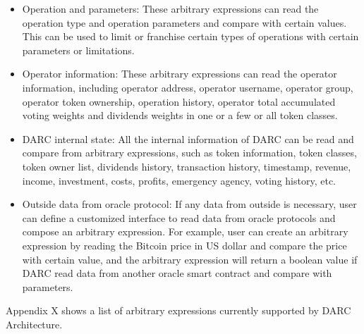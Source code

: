 \documentclass[main.tex]{subfiles}
\begin{document}
\begin{itemize}
    \item Operation and parameters: These arbitrary expressions can read the operation type and operation parameters and compare with certain values. This can be used to limit  or franchise certain types of operations with certain parameters or limitations. 
    \item Operator information: These arbitrary expressions can read the operator information, including operator address, operator username, operator group, operator token ownership, operation history, operator total accumulated voting weights and dividends weights in one or a few or all token classes.
    \item DARC internal state: All the internal information of DARC can be read and compare from arbitrary expressions, such as token information, token classes, token owner list, dividends history, transaction history, timestamp, revenue, income, investment, costs, profits, emergency agency, voting history, etc.
    \item Outside data from oracle protocol: If any data from outside is necessary, user can define a customized interface to read data from oracle protocols and compose an arbitrary expression. For example, user can create an arbitrary expression by reading the Bitcoin price in US dollar and compare the price with certain value, and the arbitrary expression will return a boolean value if DARC read data from another oracle smart contract and compare with parameters.
\end{itemize}

Appendix X shows a list of arbitrary expressions currently supported by DARC Architecture.
\end{document}
